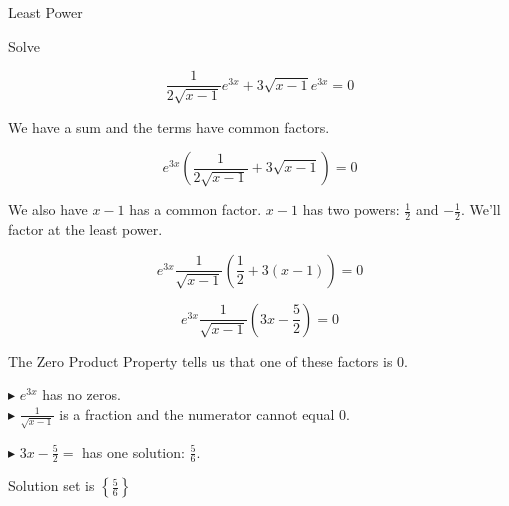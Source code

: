 \documentclass{ximera}
\begin{document}
\begin{example} Least Power



Solve 


\[  \frac{1}{2 \sqrt{x-1}} e^{3x}  + 3 \sqrt{x-1} e^{3x} = 0  \]


\begin{explanation} 

We have a sum and the terms have common factors.



\[  e^{3x}  \left( \frac{1}{2 \sqrt{x-1}}  + 3 \sqrt{x-1}  \right) = 0  \]



We also have $x-1$ has a common factor.  $x-1$ has two powers: $\tfrac{1}{2}$ and $-\tfrac{1}{2}$.  We'll factor at the least power.


\[  e^{3x}  \frac{1}{\sqrt{x-1}}   \left( \frac{1}{2}  + 3 (x-1)  \right) = 0 \]

\[  e^{3x}  \frac{1}{\sqrt{x-1}}   \left( 3x - \frac{5}{2}  \right) = 0  \]





The Zero Product Property tells us that one of these factors is $0$.



$\blacktriangleright$   $e^{3x}$ has no zeros. \\


$\blacktriangleright$   $\frac{1}{\sqrt{x-1}}$ is a fraction and the numerator cannot equal $0$.


$\blacktriangleright$  $3x - \frac{5}{2} = $ has one solution:  $\frac{5}{6}$.



Solution set is $\left\{  \frac{5}{6} \right\}$

\end{explanation}
\end{example}
\end{document}
